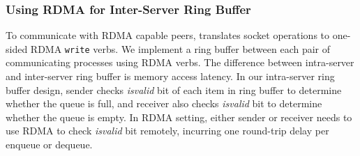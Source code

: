 




\subsubsection{Using RDMA for Inter-Server Ring Buffer}
\label{subsec:rdma-ring-buffer}

To communicate with RDMA capable peers, \libipc{} translates socket operations to one-sided RDMA \texttt{write} verbs. We implement a ring buffer between each pair of communicating processes using RDMA verbs. The difference between intra-server and inter-server ring buffer is memory access latency. In our intra-server ring buffer design, sender checks \textit{isvalid} bit of each item in ring buffer to determine whether the queue is full, and receiver also checks \textit{isvalid} bit to determine whether the queue is empty. In RDMA setting, either sender or receiver needs to use RDMA to check \textit{isvalid} bit remotely, incurring one round-trip delay per enqueue or dequeue.

